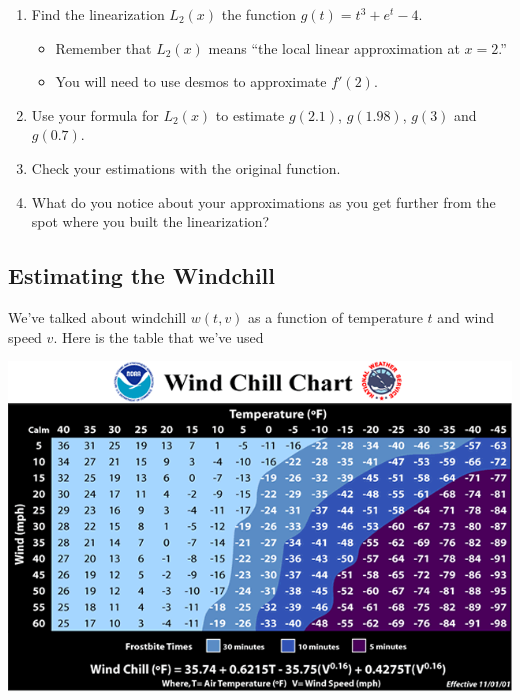 \documentclass[
]{book}
\providecommand{\tightlist}{%
  \setlength{\itemsep}{0pt}\setlength{\parskip}{0pt}}
\begin{document}
\begin{enumerate}
\def\labelenumi{\arabic{enumi}.}
\item
  Find the linearization \(L_2(x)\) the function \(g(t)=t^3+e^t-4\).

  \begin{itemize}
  \tightlist
  \item
    Remember that \(L_2(x)\) means ``the local linear approximation at \(x=2\).''\\
  \item
    You will need to use desmos to approximate \(f'(2)\).
  \end{itemize}
\item
  Use your formula for \(L_2(x)\) to estimate \(g(2.1)\), \(g(1.98)\), \(g(3)\) and \(g(0.7)\).
\item
  Check your estimations with the original function.
\item
  What do you notice about your approximations as you get further from the spot where you built the linearization?
\end{enumerate}

\hypertarget{estimating-the-windchill}{%
\subsection{Estimating the Windchill}\label{estimating-the-windchill}}

We've talked about windchill \(w(t,v)\) as a function of temperature \(t\) and wind speed \(v\). Here is the table that we've used

\includegraphics[width=1\textwidth,height=\textheight]{images/wind-chill.png}
\end{document}

